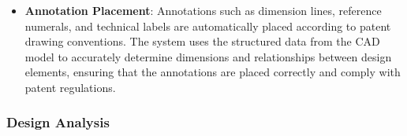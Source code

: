 \documentclass[12pt]{article}
\begin{document}
\begin{itemize}


\item \textbf{Annotation Placement}: Annotations such as dimension lines, reference numerals, and technical labels are automatically placed according to patent drawing conventions. The system uses the structured data from the CAD model to accurately determine dimensions and relationships between design elements, ensuring that the annotations are placed correctly and comply with patent regulations.

\end{itemize}


\subsubsection{Design Analysis}
\end{document}
